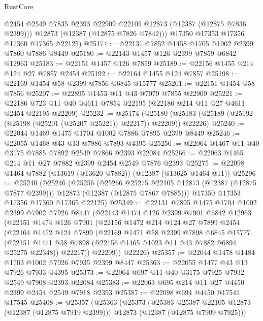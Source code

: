 \begin{lexlean}{RustCore}
\begin{coremodule}
          @2454
          @2549
          @7835
          @2393
          @22909
          @22105
          @12873
          (@12387 (@12875 @7836 @2399)))
        @12873
        (@12387 (@12875 @7826 @7842)))
      @17350
      @17353
      @17356
      @17360
      @17365
      @22125)
@25174 := @22131 @7852 @1458 @1705 @1002 @2399 @7860 @7886 @8449
@25180 := @22143 @1457 @126 @2399 @7859 @6842 @12963
@25183 := @22151 @1457 @126 @7859
@25189 := @22156 @1455 @214 @124 @27 @7857 @2454
@25192 := @22164 @1455 @124 @7857
@25198 := @22169 @1454 @58 @2399 @7856 @6845 @15777
@25201 := @22151 @1454 @58 @7856
@25207 := @22895 @1453 @11 @43 @7079 @7855 @22909
@25221 := @22186 @723 @11 @40 @4611 @7854 @22195 (@22186 @214 @11 @27 @4611 @2454 @22195 @22209)
@25232 := @25174
    (@25180 (@25183 (@25189 (@25192 (@25198 (@25201 (@25207 @25221)) @22217)) @22209)) @22226)
@25240 := @22044 @1469 @1475 @1704 @1002 @7886 @7895 @2399 @8449
@25246 := @22055 @1468 @43 @13 @7886 @7893 @4395
@25256 := @22064 @1467 @11 @40 @3175 @7885 @7892 @2549 @7866 @2393 @22084
@25266 := @22063 @1465 @214 @11 @27 @7882 @2399 @2454 @2549 @7876 @2393
@25275 := @22098 @1464 @7882 (@13619 (@13620 @7882)) (@12387 (@13625 @1464 @11))
@25296 := @25240
    (@25246
      (@25256
        (@25266 @25275 @22105 @12873 (@12387 (@12875 @7877 @2399)))
        @12873
        (@12387 (@12875 @7867 @7885)))
      @17350
      @17353
      @17356
      @17360
      @17365
      @22125)
@25349 := @22131
    @7895
    @1475
    @1704
    @1002
    @2399
    @7902
    @7926
    @8447
    (@22143
      @1474
      @126
      @2399
      @7901
      @6842
      @12963
      (@22151
        @1474
        @126
        @7901
        (@22156
          @1472
          @214
          @124
          @27
          @7899
          @2454
          (@22164
            @1472
            @124
            @7899
            (@22169
              @1471
              @58
              @2399
              @7898
              @6845
              @15777
              (@22151 @1471 @58 @7898 (@22156 @1465 @1023 @11 @43 @7882 @6894 @25275 @22348))
              @22217))
          @22209))
      @22226)
@25357 := @22044 @1478 @1484 @1703 @1002 @7926 @7935 @2399 @8447
@25363 := @22055 @1477 @43 @13 @7926 @7933 @4395
@25373 := @22064 @697 @11 @40 @3175 @7925 @7932 @2549 @7908 @2393 @22084
@25383 := @22063 @695 @214 @11 @27 @4450 @2399 @2454 @2549 @7918 @2393
@25387 := @22098 @694 @4450 @17541 @17545
@25408 := @25357
    (@25363
      (@25373
        (@25383 @25387 @22105 @12873 (@12387 (@12875 @7919 @2399)))
        @12873
        (@12387 (@12875 @7909 @7925)))

\end{coremodule}
\end{lexlean}
